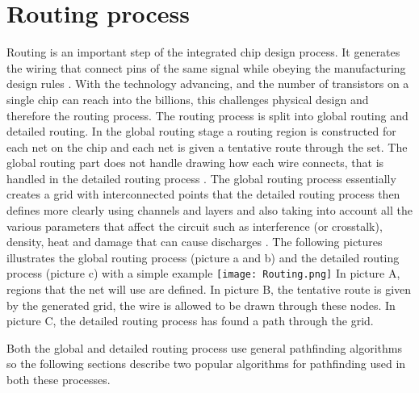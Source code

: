 \documentclass{kththesis}
\begin{document}
\section{Routing process}
Routing is an important step of the integrated chip design process. It generates the wiring that connect pins of the same signal while obeying the manufacturing design rules \parencite{EDA_routing}. With the technology advancing, and the number of transistors on a single chip can reach into the billions, this challenges physical design and therefore the routing process.
The routing process is split into global routing and detailed routing. In the global routing stage a routing region is constructed for each net on the chip and each net is given a tentative route through the set. The global routing part does not handle drawing how each wire connects, that is handled in the detailed routing process \parencite{routing11}. The global routing process essentially creates a grid with interconnected points that the detailed routing process then defines more clearly using channels and layers and also taking into account all the various parameters that affect the circuit such as interference (or crosstalk), density, heat and damage that can cause discharges \parencite{EDA_routing}. The following pictures illustrates the global routing process (picture a and b) and the detailed routing process (picture c) with a simple example
\texttt{[image: Routing.png]}
In picture A, regions that the net will use are defined. In picture B, the tentative route is given by the generated grid, the wire is allowed to be drawn through these nodes. In picture C, the detailed routing process has found a path through the grid.

Both the global and detailed routing process use general pathfinding algorithms so the following sections describe two popular algorithms for pathfinding used in both these processes.
\end{document}
